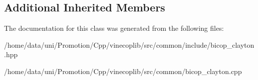 \subsection*{Additional Inherited Members}


The documentation for this class was generated from the following files\+:\begin{DoxyCompactItemize}
\item 
/home/data/uni/\+Promotion/\+Cpp/vinecoplib/src/common/include/bicop\+\_\+clayton.\+hpp\item 
/home/data/uni/\+Promotion/\+Cpp/vinecoplib/src/common/bicop\+\_\+clayton.\+cpp\end{DoxyCompactItemize}
